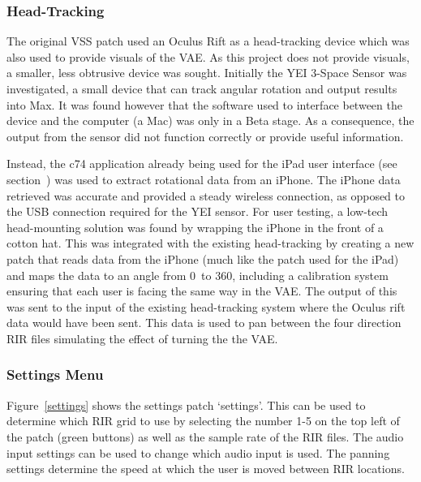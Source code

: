 \documentclass[../../main.tex]{subfiles}
\begin{document}
	\subsubsection{Head-Tracking}

		The original \ac{VSS} patch used an Oculus Rift as a head-tracking device which was also used to provide visuals of the \ac{VAE}. As this project does not provide visuals, a smaller, less obtrusive device was sought. Initially the YEI 3-Space Sensor \cite{YEI} was investigated, a small device that can track angular rotation and output results into Max. It was found however that the software used to interface between the device and the computer (a Mac) was only in a Beta stage. As a consequence, the output from the sensor did not function correctly or provide useful information.

		Instead, the c74 application already being used for the iPad user interface (see section~) was used to extract rotational data from an iPhone. The iPhone data retrieved was accurate and provided a steady wireless connection, as opposed to the USB connection required for the YEI sensor. For user testing, a low-tech head-mounting solution was found by wrapping the iPhone in the front of a cotton hat. This was integrated with the existing head-tracking by creating a new patch that reads data from the iPhone (much like the patch used for the iPad) and maps the data to an angle from 0\textdegree~to 360\textdegree, including a calibration system ensuring that each user is facing the same way in the \ac{VAE}. The output of this was sent to the input of the existing head-tracking system where the Oculus rift data would have been sent. This data is used to pan between the four direction \ac{RIR} files simulating the effect of turning the the \ac{VAE}.

	\subsubsection{Settings Menu}

	Figure~\ref{settings} shows the settings patch `settings'. This can be used to determine which \ac{RIR} grid to use by selecting the number 1-5 on the top left of the patch (green buttons) as well as the sample rate of the \ac{RIR} files. The audio input settings can be used to change which audio input is used. The panning settings determine the speed at which the user is moved between \ac{RIR} locations.
\end{document}

